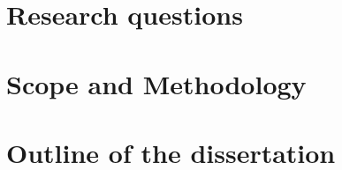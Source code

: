 \section{Research questions}


\section{Scope and Methodology}

\section{Outline of the dissertation}





